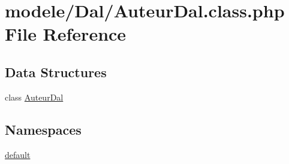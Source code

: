 \hypertarget{_auteur_dal_8class_8php}{}\section{modele/\+Dal/\+Auteur\+Dal.class.\+php File Reference}
\label{_auteur_dal_8class_8php}
\subsection*{Data Structures}
\begin{DoxyCompactItemize}
\item 
class \hyperlink{class_auteur_dal}{Auteur\+Dal}
\end{DoxyCompactItemize}
\subsection*{Namespaces}
\begin{DoxyCompactItemize}
\item 
 \hyperlink{namespacedefault}{default}
\end{DoxyCompactItemize}
